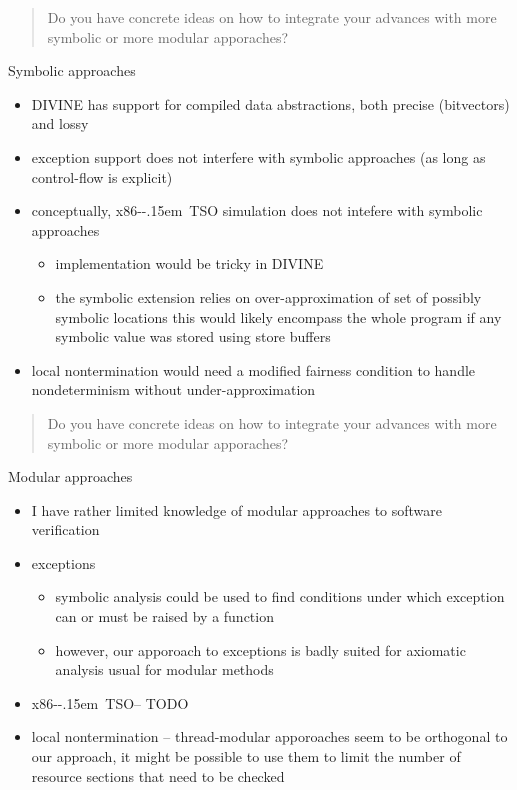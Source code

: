 \documentclass[aspectratio=169, fi]{paradise-slide}
\newcommand{\xtso}{\mbox{x86-\kern-.15em TSO}\xspace}
\newcommand{\rquote}[1]{\begin{quote}#1\end{quote}\bigskip\setlength{\leftmargini}{1em}}
\begin{document}
\begin{frame}{\qtitle}
  \rquote{Do you have concrete ideas on how to integrate your advances with more symbolic or more
    modular apporaches?}

  Symbolic approaches
  \begin{itemize}
    \item DIVINE has support for compiled data abstractions, both precise (bitvectors) and lossy
    \item exception support does not interfere with symbolic approaches (as long as control-flow is
      explicit)
    \item conceptually, \xtso simulation does not intefere with symbolic approaches
      \begin{itemize}
        \item implementation would be tricky in DIVINE
        \item the symbolic extension relies on over-approximation of set of possibly symbolic
          locations this would likely encompass the whole program if any symbolic value was stored
          using store buffers
      \end{itemize}
    \item local nontermination would need a modified fairness condition to handle nondeterminism
      without under-approximation
  \end{itemize}
\end{frame}

\begin{frame}{\qtitle}
  \rquote{Do you have concrete ideas on how to integrate your advances with more symbolic or more
    modular apporaches?}

  Modular approaches
  \begin{itemize}
    \item I have rather limited knowledge of modular approaches to software verification
    \item exceptions
      \begin{itemize}
        \item symbolic analysis could be used to find conditions under which exception can
          or must be raised by a function
        \item however, our apporoach to exceptions is badly suited for axiomatic analysis usual for
          modular methods
      \end{itemize}
    \item \xtso – TODO
    \item local nontermination – thread-modular apporoaches seem to be orthogonal to our approach,
      it might be possible to use them to limit the number of resource sections that need to be
      checked
  \end{itemize}
\end{frame}
\end{document}
